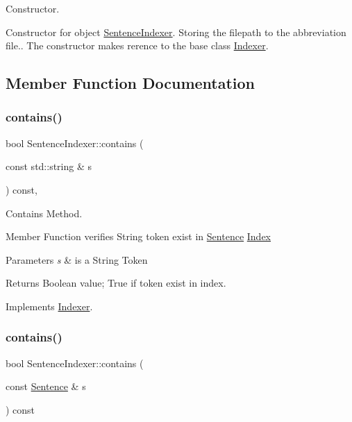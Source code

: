 Constructor. 

Constructor for object \hyperlink{class_sentence_indexer}{Sentence\+Indexer}. Storing the filepath to the abbreviation file.. The constructor makes rerence to the base class \hyperlink{class_indexer}{Indexer}. 

\subsection{Member Function Documentation}
\mbox{\label{class_sentence_indexer_af3299500d89ff36586472f81eb8efae8}} 
\subsubsection{\texorpdfstring{contains()}{contains()}\hspace{0.1cm}{\footnotesize\ttfamily [1/2]}}
{\footnotesize\ttfamily bool Sentence\+Indexer\+::contains (\begin{DoxyParamCaption}\item[{const std\+::string \&}]{s }\end{DoxyParamCaption}) const\hspace{0.3cm}{\ttfamily [override]}, {\ttfamily [virtual]}}



Contains Method. 

Member Function verifies String token exist in \hyperlink{class_sentence}{Sentence} \hyperlink{class_index}{Index}


\begin{DoxyParams}{Parameters}
{\em s} & is a String Token \\
\hline
\end{DoxyParams}
\begin{DoxyReturn}{Returns}
Boolean value; True if token exist in index. 
\end{DoxyReturn}


Implements \hyperlink{class_indexer_abb847ff86be1ec9265fb53a5ac6f7008}{Indexer}.

\mbox{\label{class_sentence_indexer_aa4af4b0d8b859bd6ff4eed4889c8447c}} 
\subsubsection{\texorpdfstring{contains()}{contains()}\hspace{0.1cm}{\footnotesize\ttfamily [2/2]}}
{\footnotesize\ttfamily bool Sentence\+Indexer\+::contains (\begin{DoxyParamCaption}\item[{const \hyperlink{class_sentence}{Sentence} \&}]{s }\end{DoxyParamCaption}) const}



